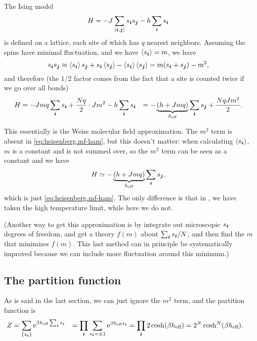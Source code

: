 \documentclass[hyperref, a4paper]{article}
\newcommand*{\ee}{\mathrm{e}}
\newcommand*{\pair}[1]{\langle #1 \rangle}
\def\\{}%
\begin{document}
The Ising model 
\begin{equation}
    H = - J \sum_{\pair{\vb*{i}, \vb*{j}}} s_{\vb*{i}} s_{\vb*{j}} - h \sum_{\vb*{i}} s_{\vb*{i}}
\end{equation}
is defined on a lattice,
each site of which has $q$ nearest neighbors.
Assuming the spins have minimal fluctuation, 
and we have $\expval{s_{\vb*{i}}} = m$, 
we have 
\[
    s_{\vb*{i}} s_{\vb*{j}} \approx 
    \expval{s_{\vb*{i}}} s_{\vb*{j}} + s_{\vb*{i}} \expval{s_{\vb*{j}}} 
    - \expval{s_{\vb*{i}}} \expval{s_{\vb*{j}}} = 
    m (s_{\vb*{i}} + s_{\vb*{j}}) - m^2,
\]
and therefore (the $1/2$ factor comes from the fact that a site is counted twice 
if we go over all bonds)
\begin{equation}
    \begin{aligned}
        H &= - J m q \sum_{\vb*{i}} s_{\vb*{i}} 
        + \frac{N q}{2} \cdot J m^2 - h \sum_{\vb*{i}} s_{\vb*{i}} \\
        &= - \underbrace{(h + Jmq)}_{h_{\text{eff}}} \sum_{\vb*{i}} s_{\vb*{j}} 
        + \frac{NqJm^2}{2} .
    \end{aligned}
    \label{eq:ising.mean-field-ham}
\end{equation}

This essentially is the Weiss molecular field approximation.
The $m^2$ term is absent in \eqref{eq:heisenberg.mf-ham}, 
but this doesn't matter: 
when calculating $\expval{s_{\vb*{i}}}$, 
$m$ is a constant and is not summed over, 
so the $m^2$ term can be seen as a constant 
and we have 
\[
    H \simeq - \underbrace{(h + Jmq)}_{h_{\text{eff}}} \sum_{\vb*{i}} s_{\vb*{j}} ,
\]
which is just \eqref{eq:heisenberg.mf-ham}.
The only difference is that in ,
we have taken the high temperature limit, 
while here we do not.

(Another way to get this approximation is 
by integrate out microscopic $s_{\vb*{i}}$ degrees of freedom, 
and get a theory $f(m)$ about $\sum_{\vb*{i}} s_{\vb*{i}} / N$, 
and then find the $m$ that minimizes $f(m)$.
This last method can in principle be systematically improved 
because we can include more fluctuation around this minimum.) 

\subsection{The partition function}

As is said in the last section, 
we can just ignore the $m^2$ term, 
and the partition function is 
\begin{equation}
    \begin{aligned}
        Z &= \sum_{\{s_{\vb*{i}}\}} \ee^{ \beta h_{\text{eff}} \sum_{\vb*{i}} s_{\vb*{i}}} \\
        &= \prod_{\vb*{i}} \sum_{s_{\vb*{i}} = \pm 1} 
        \ee^{\beta h_{\text{eff}} s_{\vb*{i}}} = \prod_{\vb*{i}} 2 \cosh (\beta h_{\text{eff}}) \\
        &= 2^N \cosh^N (\beta h_{\text{eff}}). 
    \end{aligned} 
\end{equation}
\end{document}

